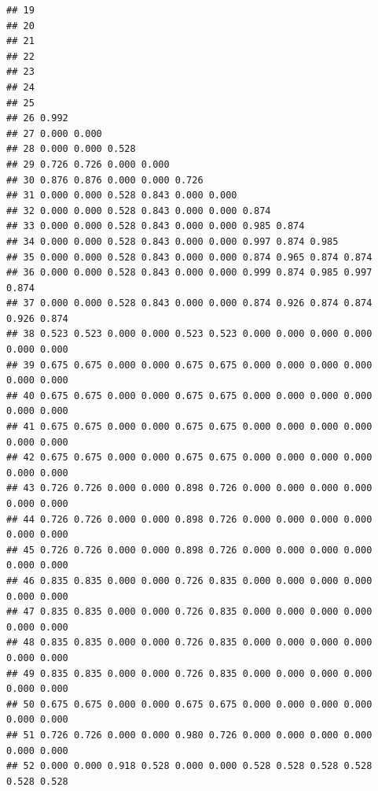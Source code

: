 \documentclass[
]{book}
\begin{document}
\begin{verbatim}
## 19                                                                        
## 20                                                                        
## 21                                                                        
## 22                                                                        
## 23                                                                        
## 24                                                                        
## 25                                                                        
## 26 0.992                                                                  
## 27 0.000 0.000                                                            
## 28 0.000 0.000 0.528                                                      
## 29 0.726 0.726 0.000 0.000                                                
## 30 0.876 0.876 0.000 0.000 0.726                                          
## 31 0.000 0.000 0.528 0.843 0.000 0.000                                    
## 32 0.000 0.000 0.528 0.843 0.000 0.000 0.874                              
## 33 0.000 0.000 0.528 0.843 0.000 0.000 0.985 0.874                        
## 34 0.000 0.000 0.528 0.843 0.000 0.000 0.997 0.874 0.985                  
## 35 0.000 0.000 0.528 0.843 0.000 0.000 0.874 0.965 0.874 0.874            
## 36 0.000 0.000 0.528 0.843 0.000 0.000 0.999 0.874 0.985 0.997 0.874      
## 37 0.000 0.000 0.528 0.843 0.000 0.000 0.874 0.926 0.874 0.874 0.926 0.874
## 38 0.523 0.523 0.000 0.000 0.523 0.523 0.000 0.000 0.000 0.000 0.000 0.000
## 39 0.675 0.675 0.000 0.000 0.675 0.675 0.000 0.000 0.000 0.000 0.000 0.000
## 40 0.675 0.675 0.000 0.000 0.675 0.675 0.000 0.000 0.000 0.000 0.000 0.000
## 41 0.675 0.675 0.000 0.000 0.675 0.675 0.000 0.000 0.000 0.000 0.000 0.000
## 42 0.675 0.675 0.000 0.000 0.675 0.675 0.000 0.000 0.000 0.000 0.000 0.000
## 43 0.726 0.726 0.000 0.000 0.898 0.726 0.000 0.000 0.000 0.000 0.000 0.000
## 44 0.726 0.726 0.000 0.000 0.898 0.726 0.000 0.000 0.000 0.000 0.000 0.000
## 45 0.726 0.726 0.000 0.000 0.898 0.726 0.000 0.000 0.000 0.000 0.000 0.000
## 46 0.835 0.835 0.000 0.000 0.726 0.835 0.000 0.000 0.000 0.000 0.000 0.000
## 47 0.835 0.835 0.000 0.000 0.726 0.835 0.000 0.000 0.000 0.000 0.000 0.000
## 48 0.835 0.835 0.000 0.000 0.726 0.835 0.000 0.000 0.000 0.000 0.000 0.000
## 49 0.835 0.835 0.000 0.000 0.726 0.835 0.000 0.000 0.000 0.000 0.000 0.000
## 50 0.675 0.675 0.000 0.000 0.675 0.675 0.000 0.000 0.000 0.000 0.000 0.000
## 51 0.726 0.726 0.000 0.000 0.980 0.726 0.000 0.000 0.000 0.000 0.000 0.000
## 52 0.000 0.000 0.918 0.528 0.000 0.000 0.528 0.528 0.528 0.528 0.528 0.528

\end{verbatim}
\end{document}
